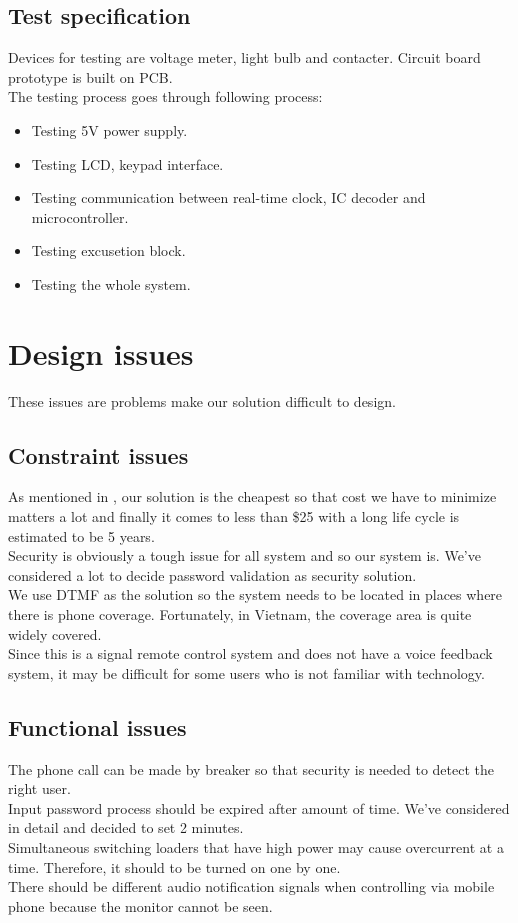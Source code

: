 \documentclass[a4paper]{article}
\begin{document}
\subsection{Test specification}
Devices for testing are voltage meter, light bulb and contacter. Circuit board prototype is built on PCB.\\
The testing process goes through following process:
\begin{itemize}
    \item Testing 5V power supply.
    \item Testing LCD, keypad interface.
    \item Testing communication between real-time clock, IC decoder and microcontroller.
    \item Testing excusetion block.
    \item Testing the whole system.
\end{itemize}

\newpage
\section{Design issues}\label{model}
These issues are problems make our solution difficult to design.
\subsection{Constraint issues}
As mentioned in \textbf{}, our solution is the cheapest so that cost we have to minimize matters a lot and finally it comes to less than \$25 with a long life cycle is estimated to be 5 years.\\
Security is obviously a tough issue for all system and so our system is. We've considered a lot to decide password validation as security solution.\\
We use DTMF as the solution so the system needs to be located in places where there is phone coverage. Fortunately, in Vietnam, the coverage area is quite widely covered.\\
Since this is a signal remote control system and does not have a voice feedback system, it may be difficult for some users who is not familiar with technology.
\subsection{Functional issues}
The phone call can be made by breaker so that security is needed to detect the right user.\\
Input password process should be expired after amount of time. We've considered in detail and decided to set 2 minutes.\\
Simultaneous switching loaders that have high power may cause overcurrent at a time. Therefore, it should to be turned on one by one.\\
There should be different audio notification signals when controlling via mobile phone because the monitor cannot be seen.
\end{document}
